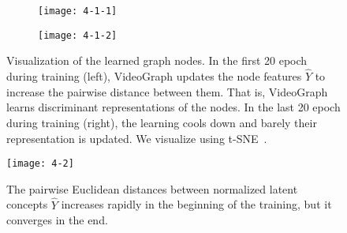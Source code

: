 \documentclass[10pt,twocolumn,letterpaper]{article}
\begin{document}
\begin{figure}
\begin{subfigure}[t]{0.22\textwidth}
\texttt{[image: 4-1-1]}
\caption{}
\vspace*{-2mm}
\label{fig:4-1-1}
\end{subfigure}\hfill
\begin{subfigure}[t]{0.22\textwidth}
\texttt{[image: 4-1-2]}
\caption{}
\vspace*{-2mm}
\label{fig:4-1-2}
\end{subfigure}
\caption{Visualization of the learned graph nodes.
In the first 20 epoch during training (left), VideoGraph updates the node features $\hat{Y}$ to increase the pairwise distance between them.
That is, VideoGraph learns discriminant representations of the nodes.
In the last 20 epoch during training (right), the learning cools down and barely their representation is updated.
We visualize using t-SNE~\cite{maaten2008visualizing}.}
\vspace*{-5mm}
\label{fig:4-1}
\end{figure}

\begin{figure}[!ht]
\begin{center}
\texttt{[image: 4-2]}
\end{center}
\vspace*{-5mm}
\caption{
The pairwise Euclidean distances between normalized latent concepts $\hat{Y}$ increases rapidly in the beginning of the training, but it converges in the end.}
\label{fig:4-4}
\vspace*{-5mm}
\end{figure}
\end{document}
